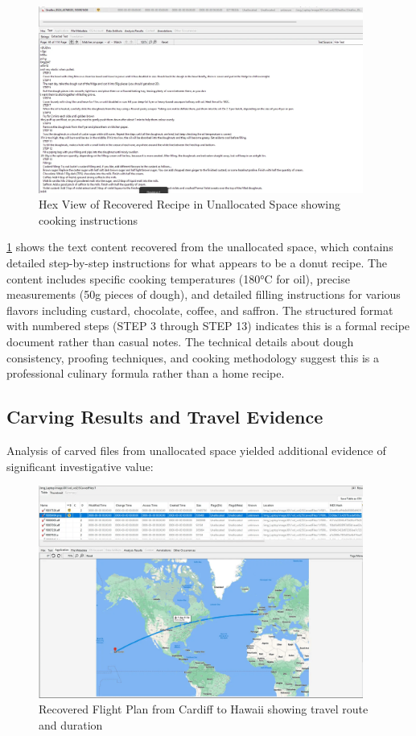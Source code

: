 \begin{figure}[htbp]
    \centering
    \includegraphics[width=0.95\textwidth]{images/Evidence Examination/Image4.png}
    \caption{Hex View of Recovered Recipe in Unallocated Space showing cooking instructions}
    \label{fig:hex_view}
\end{figure}

\ref{fig:hex_view} shows the text content recovered from the unallocated space, which contains detailed step-by-step instructions for what appears to be a donut recipe. The content includes specific cooking temperatures (180°C for oil), precise measurements (50g pieces of dough), and detailed filling instructions for various flavors including custard, chocolate, coffee, and saffron. The structured format with numbered steps (STEP 3 through STEP 13) indicates this is a formal recipe document rather than casual notes. The technical details about dough consistency, proofing techniques, and cooking methodology suggest this is a professional culinary formula rather than a home recipe.

\subsection{Carving Results and Travel Evidence}
Analysis of carved files from unallocated space yielded additional evidence of significant investigative value:

\begin{figure}[htbp]
    \centering
    \includegraphics[width=0.95\textwidth]{images/Evidence Examination/Image5.png}
    \caption{Recovered Flight Plan from Cardiff to Hawaii showing travel route and duration}
    \label{fig:flight_plan}
\end{figure}

